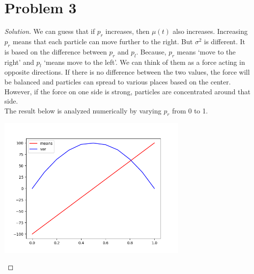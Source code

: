\section*{Problem 3}
	\begin{proof} [Solution]
		We can guess that if $p_r$ increases, then $\mu(t)$ also increases. Increasing $p_r$ means that each particle can move further to the right. But $\sigma^2$ is different. It is based on the difference between $p_r$ and $p_l$. Because, $p_r$ means `move to the right' and $p_l$ `means move to the left'. We can think of them as a force acting in opposite directions. If there is no difference between the two values, the force will be balanced and particles can spread to various places based on the center. However, if the force on one side is strong, particles are concentrated around that side.\\
		The result below is analyzed numerically by varying $p_r$ from 0 to 1.
		\begin{center}
			\includegraphics[width=0.7\textwidth]{mean_var.png}
		\end{center}
	\end{proof}